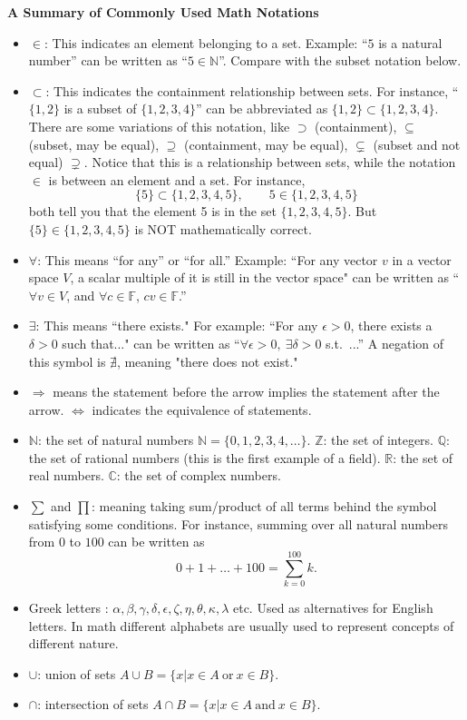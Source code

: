 \documentclass[11pt]{article}
\theoremstyle{plain}
\theoremstyle{definition}
\def\R{\mathbb R}
\def\Q{\mathbb Q}
\def\Z{\mathbb Z}
\def\N{\mathbb N}
\def\C{\mathbb C}
\def\F{\mathbb F}
\begin{document}
\begin{center}
{\Large \bf A Summary of Commonly Used Math Notations}
\end{center}

\begin{itemize}
\item $\in$: This indicates an element belonging to a set. Example: ``$5$ is a natural number'' can be written as ``$5\in \N$''. Compare with the subset notation below.
\item $\subset$: This indicates the containment relationship between sets. For instance, ``$\{1,2\}$ is a subset of $\{1,2,3,4\}$'' can be abbreviated as $\{1,2\}\subset \{1,2,3,4\}$. There are some variations of this notation, like $\supset$ (containment), $\subseteq$ (subset, may be equal), $\supseteq$ (containment, may be equal), $\subsetneq$ (subset and not equal) $\supsetneq$. Notice that this is a relationship between sets, while the notation $\in$ is between an element and a set. For instance, 
\[
\{5\} \subset \{1,2,3,4,5\}, \quad \quad 5\in \{1,2,3,4,5\}
\]
both tell you that the element 5 is in the set $\{1,2,3,4,5\}$. But $\{5\}\in \{1,2,3,4,5\}$ is NOT mathematically correct.
\item $\forall$: This means ``for any'' or ``for all.'' Example: ``For any vector $v$ in a vector space $V$, a scalar multiple of it is still in the vector space" can be written as ``$\forall v\in V$, and $\forall c\in \F$, $cv\in \F$.''
\item $\exists$: This means ``there exists." For example: ``For any $\epsilon>0$, there exists a $\delta>0$ such that..." can be written as ``$\forall \epsilon>0,~\exists \delta>0$ s.t.~...'' A negation of this symbol is $\nexists$, meaning "there does not exist."
\item $\Rightarrow$ means the statement before the arrow implies the statement after the arrow. $\Leftrightarrow$ indicates the equivalence of statements.
\item $\N$: the set of natural numbers $\N=\{0,1,2,3,4,\dots\}$. $\Z$: the set of integers. $\Q$: the set of rational numbers (this is the first example of a field). $\R$: the set of real numbers. $\C$: the set of complex numbers.
\item $\sum$ and $\prod$: meaning taking sum/product of all terms behind the symbol satisfying some conditions. For instance, summing over all natural numbers from $0$ to $100$ can be written as
    \[
    0+1+\dots+100=\sum_{k=0}^{100} k.
    \]
\item Greek letters : $\alpha,\beta,\gamma,\delta,\epsilon,\zeta,\eta,\theta,\kappa,\lambda$ etc. Used as alternatives for English letters. In math different alphabets are usually used to represent concepts of different nature.
\item $\cup$: union of sets $A\cup B=\{x|x\in A~\textrm{or}~x\in B\}$. 
\item $\cap$: intersection of sets $A\cap B=\{x|x\in A~\textrm{and}~x\in B\}$.
\end{itemize}
\end{document}
